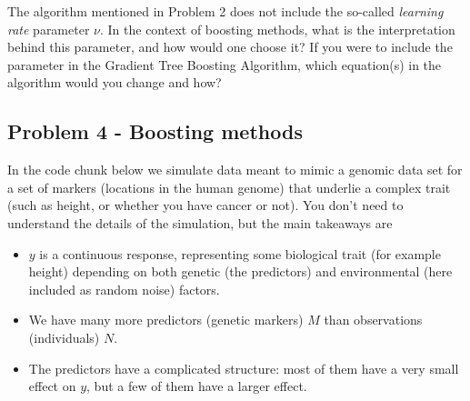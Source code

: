 \documentclass[
]{article}
\providecommand{\tightlist}{%
  \setlength{\itemsep}{0pt}\setlength{\parskip}{0pt}}
\begin{document}
The algorithm mentioned in Problem 2 does not include the so-called
\emph{learning rate} parameter \(\nu\). In the context of boosting
methods, what is the interpretation behind this parameter, and how would
one choose it? If you were to include the parameter in the Gradient Tree
Boosting Algorithm, which equation(s) in the algorithm would you change
and how?

\subsection{Problem 4 - Boosting
methods}\label{problem-4---boosting-methods}

In the code chunk below we simulate data meant to mimic a genomic data
set for a set of markers (locations in the human genome) that underlie a
complex trait (such as height, or whether you have cancer or not). You
don't need to understand the details of the simulation, but the main
takeaways are

\begin{itemize}
\tightlist
\item
  \(y\) is a continuous response, representing some biological trait
  (for example height) depending on both genetic (the predictors) and
  environmental (here included as random noise) factors.
\item
  We have many more predictors (genetic markers) \(M\) than observations
  (individuals) \(N\).
\item
  The predictors have a complicated structure: most of them have a very
  small effect on \(y\), but a few of them have a larger effect.
\end{itemize}
\end{document}
